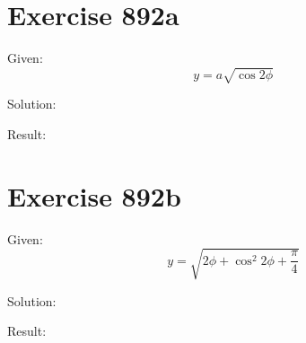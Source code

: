 \documentclass[a4paper, 10pt]{scrartcl}
\begin{document}
\section{Exercise 892a}

Given:
\[
y = a\sqrt{\cos{2\phi}}
\]

Solution:

Result:

\section{Exercise 892b}

Given:
\[
y = \sqrt{2\phi + \cos^{2}{2\phi + \frac{\pi}{4}}}
\]

Solution:

Result:
\end{document}
